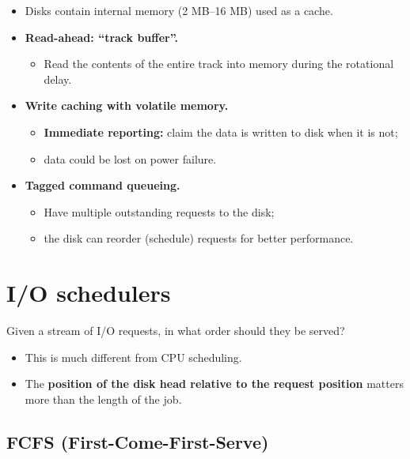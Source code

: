 \documentclass[11pt,a4paper]{article}
\begin{document}
\begin{itemize}
  \item Disks contain internal memory (2 MB--16 MB) used as a cache.
  \item \textbf{Read-ahead: ``track buffer''.}
    \begin{itemize}
      \item Read the contents of the entire track into memory during the
            rotational delay.
    \end{itemize}
  \item \textbf{Write caching with volatile memory.}
    \begin{itemize}
      \item \textbf{Immediate reporting:} claim the data is written to disk
            when it is not;
      \item data could be lost on power failure.
    \end{itemize}
  \item \textbf{Tagged command queueing.}
    \begin{itemize}
      \item Have multiple outstanding requests to the disk;
      \item the disk can reorder (schedule) requests for better performance.
    \end{itemize}
\end{itemize}

\section{I/O schedulers}

\begin{keybox}
Given a stream of I/O requests, in what order should they be served?
\begin{itemize}
  \item This is much different from CPU scheduling.
  \item The \textbf{position of the disk head relative to the request
        position} matters more than the length of the job.
\end{itemize}
\end{keybox}

\subsection{FCFS (First-Come-First-Serve)}
\end{document}
